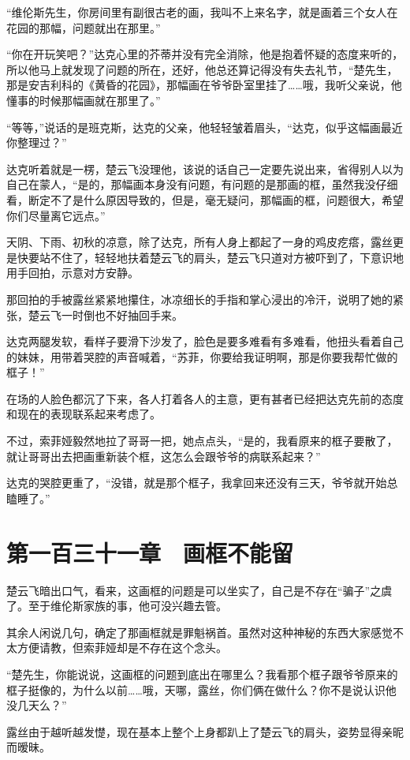 “维伦斯先生，你房间里有副很古老的画，我叫不上来名字，就是画着三个女人在花园的那幅，问题就出在那里。”

“你在开玩笑吧？”达克心里的芥蒂并没有完全消除，他是抱着怀疑的态度来听的，所以他马上就发现了问题的所在，还好，他总还算记得没有失去礼节，“楚先生，那是安吉利科的《黄昏的花园》，那幅画在爷爷卧室里挂了……哦，我听父亲说，他懂事的时候那幅画就在那里了。”

“等等，”说话的是班克斯，达克的父亲，他轻轻皱着眉头，“达克，似乎这幅画最近你整理过？”

达克听着就是一楞，楚云飞没理他，该说的话自己一定要先说出来，省得别人以为自己在蒙人，“是的，那幅画本身没有问题，有问题的是那画的框，虽然我没仔细看，断定不了是什么原因导致的，但是，毫无疑问，那幅画的框，问题很大，希望你们尽量离它远点。”

天阴、下雨、初秋的凉意，除了达克，所有人身上都起了一身的鸡皮疙瘩，露丝更是快要站不住了，轻轻地扶着楚云飞的肩头，楚云飞只道对方被吓到了，下意识地用手回拍，示意对方安静。

那回拍的手被露丝紧紧地攥住，冰凉细长的手指和掌心浸出的冷汗，说明了她的紧张，楚云飞一时倒也不好抽回手来。

达克两腿发软，看样子要滑下沙发了，脸色是要多难看有多难看，他扭头看着自己的妹妹，用带着哭腔的声音喊着，“苏菲，你要给我证明啊，那是你要我帮忙做的框子！”

在场的人脸色都沉了下来，各人打着各人的主意，更有甚者已经把达克先前的态度和现在的表现联系起来考虑了。

不过，索菲娅毅然地拉了哥哥一把，她点点头，“是的，我看原来的框子要散了，就让哥哥出去把画重新装个框，这怎么会跟爷爷的病联系起来？”

达克的哭腔更重了，“没错，就是那个框子，我拿回来还没有三天，爷爷就开始总瞌睡了。”

\section{第一百三十一章　画框不能留}

楚云飞暗出口气，看来，这画框的问题是可以坐实了，自己是不存在“骗子”之虞了。至于维伦斯家族的事，他可没兴趣去管。

其余人闲说几句，确定了那画框就是罪魁祸首。虽然对这种神秘的东西大家感觉不太方便请教，但索菲娅却是不存在这个念头。

“楚先生，你能说说，这画框的问题到底出在哪里么？我看那个框子跟爷爷原来的框子挺像的，为什么以前……哦，天哪，露丝，你们俩在做什么？你不是说认识他没几天么？”

露丝由于越听越发憷，现在基本上整个上身都趴上了楚云飞的肩头，姿势显得亲昵而暧昧。

